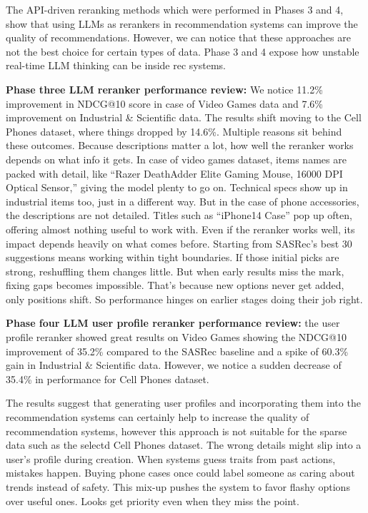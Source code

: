 \documentclass[conference]{IEEEtran}
\begin{document}
The API-driven reranking methods which were performed in Phases 3 and 4, show that using LLMs as rerankers in recommendation systems can improve the quality of recommendations. However, we can notice that these approaches are not the best choice for certain types of data. Phase 3 and 4 expose how unstable real-time LLM thinking can be inside rec systems. 

\textbf{Phase three LLM reranker performance review:} We notice 11.2\% improvement in NDCG@10 score in case of Video Games data and 7.6\% improvement on Industrial \& Scientific data. The results shift moving to the Cell Phones dataset, where things dropped by 14.6\%. Multiple reasons sit behind these outcomes.
Because descriptions matter a lot, how well the reranker works depends on what info it gets. In case of video games dataset, items names are packed with detail, like “Razer DeathAdder Elite Gaming Mouse, 16000 DPI Optical Sensor,” giving the model plenty to go on. Technical specs show up in industrial items too, just in a different way. But in the case of phone accessories, the descriptions are not detailed. Titles such as “iPhone14 Case” pop up often, offering almost nothing useful to work with.
Even if the reranker works well, its impact depends heavily on what comes before. Starting from SASRec’s best 30 suggestions means working within tight boundaries. If those initial picks are strong, reshuffling them changes little. But when early results miss the mark, fixing gaps becomes impossible. That’s because new options never get added, only positions shift. So performance hinges on earlier stages doing their job right.

\textbf{Phase four LLM user profile reranker performance review:} the user profile reranker showed great results on  Video Games showing the NDCG@10  improvement of 35.2\% compared to the SASRec baseline and a spike of 60.3\% gain in Industrial \& Scientific data. However, we notice a sudden decrease of  35.4\% in performance for Cell Phones dataset. 

The results suggest that generating user profiles and incorporating them into the recommendation systems can certainly help to increase the quality of recommendation systems, however this approach is not suitable for the sparse data such as the selectd Cell Phones dataset. The wrong details might slip into a user's profile during creation. When systems guess traits from past actions, mistakes happen. Buying phone cases once could label someone as caring about trends instead of safety. This mix-up pushes the system to favor flashy options over useful ones. Looks get priority even when they miss the point.
\end{document}
